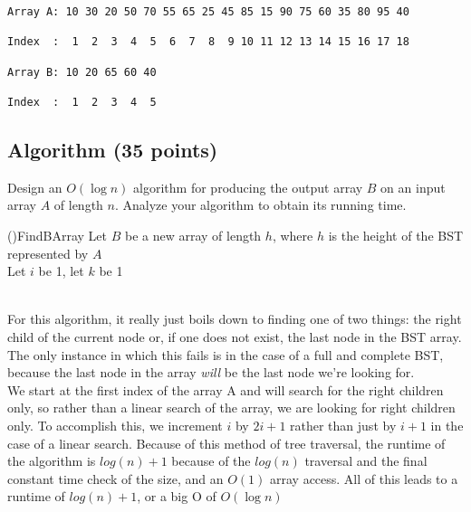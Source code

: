 \documentclass[11pt]{amsart}
\DeclarePairedDelimiter\floor{\lfloor}{\rfloor}
\begin{document}
\begin{verbatim}
Array A: 10 30 20 50 70 55 65 25 45 85 15 90 75 60 35 80 95 40

Index  :  1  2  3  4  5  6  7  8  9 10 11 12 13 14 15 16 17 18

Array B: 10 20 65 60 40

Index  :  1  2  3  4  5
\end{verbatim}
\newpage
\subsection*{Algorithm (35 points)}

Design an $O(\log n)$ algorithm for producing the output array $B$
on an input array $A$ of length $n$. Analyze your algorithm to obtain
its running time.\\
\begin{algorithm}[H]
    \Fn(){FindBArray}{
    \SetAlgoLined
    \SetNoFillComment
    \DontPrintSemicolon
        Let $B$ be a new array of length $h$, where $h$ is the height of the BST represented by $A$\\
        Let $i$ be 1, let $k$ be 1\\
        \\
    }
    \end{algorithm}
\bigskip
For this algorithm, it really just boils down to finding one of two things: the right child of the current node or, if one does not exist, the last node in the BST array. The only instance in which this fails is in the case of a full and complete BST, because the last node in the array \emph{will} be the last node we're looking for.\\
We start at the first index of the array A and will search for the right children only, so rather than a linear search of the array, we are looking for right children only. To accomplish this, we increment $i$ by $2i + 1$ rather than just by $i + 1$ in the case of a linear search. Because of this method of tree traversal, the runtime of the algorithm is $log(n) + 1$ because of the $log(n)$ traversal and the final constant time check of the size, and an $O(1)$ array access. All of this leads to a runtime of $log(n) + 1$, or a big O of $O(\log n)$
\end{document}
